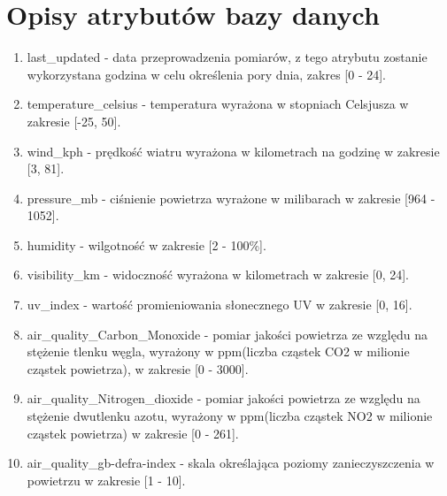 \documentclass{article}
\begin{document}
\section{Opisy atrybutów bazy danych}
\begin{enumerate}
    \item last\_updated - data przeprowadzenia pomiarów, z tego atrybutu zostanie wykorzystana godzina w celu określenia pory dnia, zakres [0 - 24]. 
    \item temperature\_celsius - temperatura wyrażona w stopniach Celsjusza w zakresie [-25, 50].
    \item wind\_kph - prędkość wiatru wyrażona w kilometrach na godzinę w zakresie [3, 81]. 
    \item pressure\_mb - ciśnienie powietrza wyrażone w milibarach w zakresie [964 - 1052]. 
    \item humidity - wilgotność w zakresie [2 - 100\%].
    \item visibility\_km - widoczność wyrażona w kilometrach w zakresie [0, 24].
    \item uv\_index - wartość promieniowania słonecznego UV w zakresie [0, 16].
    \item air\_quality\_Carbon\_Monoxide - pomiar jakości powietrza ze względu na stężenie tlenku węgla, wyrażony w ppm(liczba cząstek CO2 w milionie cząstek powietrza), w zakresie [0 - 3000].
    \item air\_quality\_Nitrogen\_dioxide - pomiar jakości powietrza ze względu na stężenie dwutlenku azotu, wyrażony w ppm(liczba cząstek NO2 w milionie cząstek powietrza) w zakresie [0 - 261].
    \item air\_quality\_gb-defra-index - skala określająca poziomy zanieczyszczenia w powietrzu w zakresie [1 - 10].

    
\end{enumerate}
\end{document}
